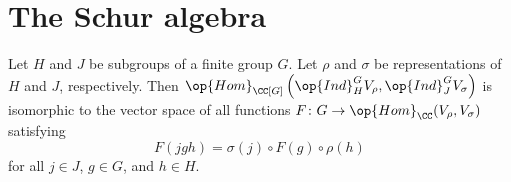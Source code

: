 \documentclass[../main.tex]{subfiles}
\begin{document}
\section{The Schur algebra}
\begin{proposition} \label{prop:homs-of-ind}
	Let $H$ and $J$ be subgroups of a finite group $G$. Let $\rho$ and $\sigma$ be representations of $H$ and $J$, respectively. Then $\op{Hom}_{\CC[G]}\left(\op{Ind}^G_HV_\rho,\op{Ind}^G_JV_\sigma\right)$ is isomorphic to the vector space of all functions $F\colon G\to\op{Hom}_\CC(V_\rho,V_\sigma)$ satisfying
	\begin{equation}
		F(jgh)=\sigma(j)\circ F(g)\circ\rho(h) \label{eq:desired-schur-vec-space}
	\end{equation}
	for all $j\in J$, $g\in G$, and $h\in H$.
\end{proposition}
\end{document}

